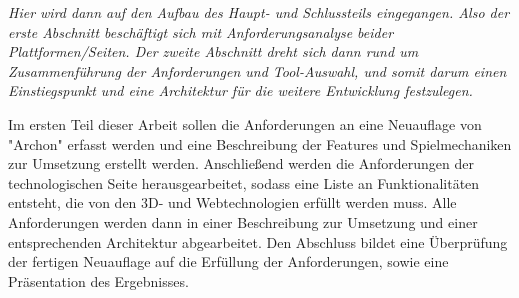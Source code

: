 \emph{Hier wird dann auf den Aufbau des Haupt- und Schlussteils eingegangen. Also der erste Abschnitt beschäftigt sich mit Anforderungsanalyse beider Plattformen/Seiten. Der zweite Abschnitt dreht sich dann rund um Zusammenführung der Anforderungen und Tool-Auswahl, und somit darum einen Einstiegspunkt und eine Architektur für die weitere Entwicklung festzulegen. }

Im ersten Teil dieser Arbeit sollen die Anforderungen an eine Neuauflage von "Archon" erfasst werden und eine Beschreibung der Features und Spielmechaniken zur Umsetzung erstellt werden.
Anschließend werden die Anforderungen der technologischen Seite herausgearbeitet, sodass eine Liste an Funktionalitäten entsteht, die von den 3D- und Webtechnologien erfüllt werden muss.
Alle Anforderungen werden dann in einer Beschreibung zur Umsetzung und einer entsprechenden Architektur abgearbeitet.
Den Abschluss bildet eine Überprüfung der fertigen Neuauflage auf die Erfüllung der Anforderungen, sowie eine Präsentation des Ergebnisses.